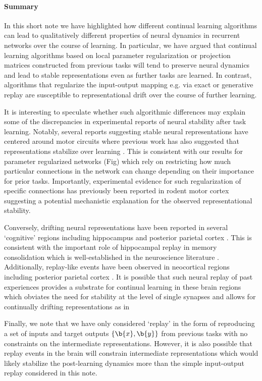 \paragraph{Summary}
In this short note we have highlighted how different continual learning algorithms can lead to qualitatively different properties of neural dynamics in recurrent networks over the course of learning.
In particular, we have argued that continual learning algorithms based on local parameter regularization or projection matrices constructed from previous tasks will tend to preserve neural dynamics and lead to stable representations even as further tasks are learned.
In contrast, algorithms that regularize the input-output mapping e.g. via exact or generative replay are susceptible to representational drift over the course of further learning.

It is interesting to speculate whether such algorithmic differences may explain some of the discrepancies in experimental reports of neural stability after task learning.
Notably, several reports suggesting stable neural representations have centered around motor circuits \citep{dhawale2017automated,chestek2007single,flint2016long,gallego2020long} where previous work has also suggested that representations stabilize over learning \citep{ganguly2009emergence, peters2014emergence}.
This is consistent with our results for parameter regularized networks (Fig) which rely on restricting how much particular connections in the network can change depending on their importance for prior tasks.
Importantly, experimental evidence for such regularization of specific connections has previously been reported in rodent motor cortex \citep{yang2009stably,fu2012repetitive} suggesting a potential mechanistic explanation for the observed representational stability.

Conversely, drifting neural representations have been reported in several `cognitive' regions including hippocampus \citep{ziv2013long} and posterior parietal cortex \citep{driscoll2017dynamic,rule2020stable}.
This is consistent with the important role of hippocampal replay in memory consolidation which is well-established in the neuroscience literature \citep{wilson1994reactivation, van2016hippocampal, carr2011hippocampal}.
Additionally, replay-like events have been observed in neocortical regions including posterior parietal cortex \citep{qin1997memory}.
It is possible that such neural replay of past experiences provides a substrate for continual learning in these brain regions which obviates the need for stability at the level of single synapses and allows for continually drifting representations as in %

Finally, we note that we have only considered `replay' in the form of reproducing a set of inputs and target outputs $\{ \b{x}, \b{y}\}$ from previous tasks with no constraints on the intermediate representations.
However, it is also possible that replay events in the brain will constrain intermediate representations which would likely stabilize the post-learning dynamics more than the simple input-output replay considered in this note.